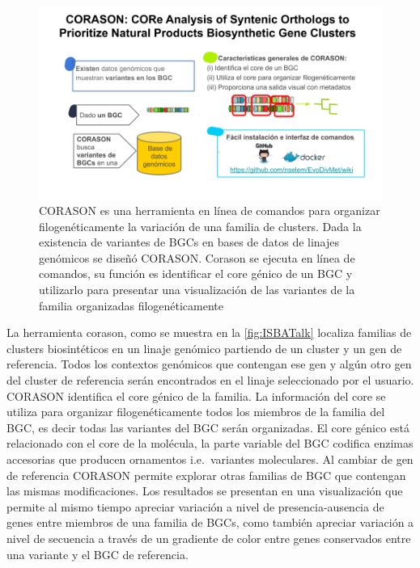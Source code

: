 \documentclass[12pt,twoside]{reedthesis}
\begin{document}
  \begin{figure}[h!tbp]
  \centering
  \includegraphics[angle = 0,scale = .4]{chapter3/ISBATalk.png}
  \caption[ CORASON es una herramienta en línea de comandos para organizar filogenéticamente la variación de una familia de clusters. ]{\footnotesize{CORASON es una herramienta en línea de comandos para organizar filogenéticamente la variación de una familia de clusters. Dada la existencia de variantes de BGCs en bases de datos  de linajes genómicos se diseñó CORASON. Corason se ejecuta en línea de comandos, su función es identificar el core génico de un BGC y utilizarlo para presentar una visualización de las variantes de la familia organizadas filogenéticamente}}
  \label{fig:ISBATalk}
  \end{figure}
  
  La herramienta corason, como se muestra en la \autoref{fig:ISBATalk}
  localiza familias de clusters biosintéticos en un linaje genómico
  partiendo de un cluster y un gen de referencia. Todos los contextos
  genómicos que contengan ese gen y algún otro gen del cluster de
  referencia serán encontrados en el linaje seleccionado por el usuario.
  CORASON identifica el core génico de la familia. La información del core
  se utiliza para organizar filogenéticamente todos los miembros de la
  familia del BGC, es decir todas las variantes del BGC serán organizadas.
  El core génico está relacionado con el core de la molécula, la parte
  variable del BGC codifica enzimas accesorias que producen ornamentos
  i.e.~variantes moleculares. Al cambiar de gen de referencia CORASON
  permite explorar otras familias de BGC que contengan las mismas
  modificaciones. Los resultados se presentan en una visualización que
  permite al mismo tiempo apreciar variación a nivel de presencia-ausencia
  de genes entre miembros de una familia de BGCs, como también apreciar
  variación a nivel de secuencia a través de un gradiente de color entre
  genes conservados entre una variante y el BGC de referencia.
  
\end{document}
